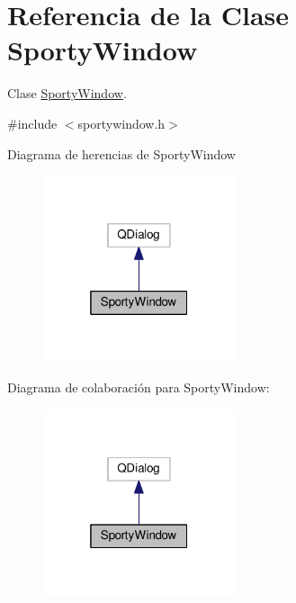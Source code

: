 \hypertarget{class_sporty_window}{}\section{Referencia de la Clase Sporty\+Window}
\label{class_sporty_window}


Clase \hyperlink{class_sporty_window}{Sporty\+Window}.  




{\ttfamily \#include $<$sportywindow.\+h$>$}



Diagrama de herencias de Sporty\+Window\nopagebreak
\begin{figure}[H]
\begin{center}
\leavevmode
\includegraphics[width=160pt]{class_sporty_window__inherit__graph}
\end{center}
\end{figure}


Diagrama de colaboración para Sporty\+Window\+:\nopagebreak
\begin{figure}[H]
\begin{center}
\leavevmode
\includegraphics[width=160pt]{class_sporty_window__coll__graph}
\end{center}
\end{figure}
